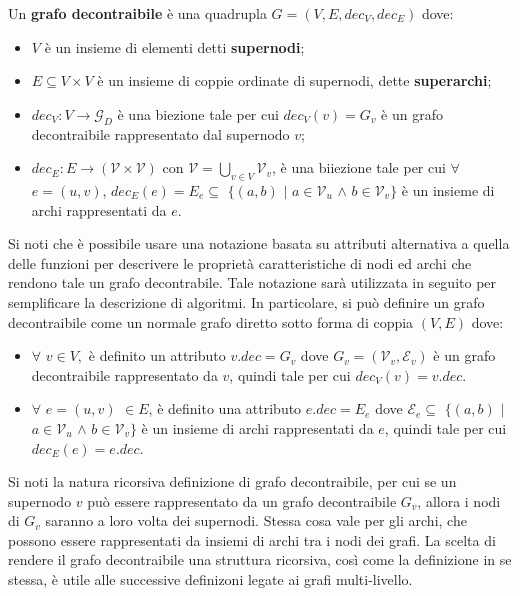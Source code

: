     \begin{defintion} \newline
    Un \textbf{grafo decontraibile} \`e una quadrupla $G = (V, E, dec_V, dec_E)$ dove:
        \begin{itemize}
            \item $V$ \`e un insieme di elementi detti \textbf{supernodi};
            \item $E \subseteq V \times V$ \`e un insieme di coppie ordinate di supernodi, dette \textbf{superarchi};
            \item $dec_V : V \rightarrow \mathcal{G}_D$ \`e una biezione tale per cui $dec_V(v) = G_v$ \`e
            un grafo decontraibile rappresentato dal supernodo $v$;
            \item $dec_E : E \rightarrow (\mathcal{V} \times \mathcal{V})$ con $\mathcal{V} = \bigcup_{v \in V}\mathcal{V}_v$,
            \`e una biiezione tale per cui $\forall$ $ e = (u, v)$, $dec_E(e) = E_e \subseteq$ $\{(a, b)$ $\mid$ $a \in \mathcal{V}_u$ $\wedge$ $b \in \mathcal{V}_v\}$
            \`e un insieme di archi rappresentati da $e$.
        \end{itemize}
    \end{defintion}

    Si noti che \`e possibile usare una notazione basata su attributi alternativa a quella delle funzioni per
    descrivere le propriet\`a caratteristiche di nodi ed archi che rendono tale un grafo decontrabile.
    Tale notazione sar\`a utilizzata in seguito per semplificare la descrizione di algoritmi. \newline
    In particolare, si pu\`o definire un grafo decontraibile come un normale grafo diretto sotto forma di coppia
    $(V, E)$ dove:
    \begin{itemize}
        \item $\forall$ $v \in V,$ \`e definito un attributo $v.dec = G_v$ dove $G_v = (\mathcal{V}_v, \mathcal{E}_v)$ \`e un grafo decontraibile
        rappresentato da $v$, quindi tale per cui $dec_V(v) = v.dec$.
        \item $\forall$ $e=(u, v)$  $\in E$, \`e definito una attributo $e.dec = E_e$ dove
        $\mathcal{E}_e \subseteq$ $\{(a, b)$ $\mid$ $a \in \mathcal{V}_u$ $\wedge$ $b \in \mathcal{V}_v\}$ \`e un insieme di archi
        rappresentati da $e$, quindi tale per cui $dec_E(e) = e.dec$.
    \end{itemize}

    Si noti la natura ricorsiva definizione di grafo decontraibile, per cui se un supernodo $v$ pu\`o essere
    rappresentato da un grafo decontraibile $G_v$, allora i nodi di $G_v$ saranno a loro volta dei supernodi.
    Stessa cosa vale per gli archi, che possono essere rappresentati da insiemi di archi tra i nodi dei grafi.
    La scelta di rendere il grafo decontraibile una struttura ricorsiva, così come la definizione in se stessa,
    \`e utile alle successive definizoni legate ai grafi multi-livello. \newline

